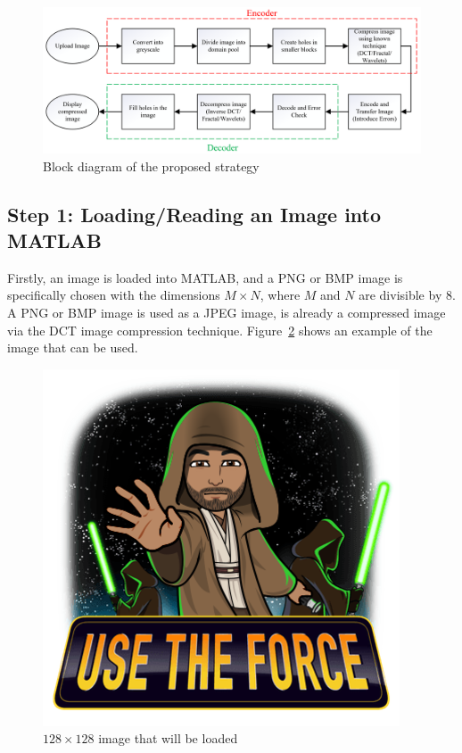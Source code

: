 \documentclass[10pt,twocolumn, a4paper]{witseiepaper}
\begin{document}
\begin{figure}[t!]
\renewcommand{\thefigure}{\arabic{figure}}
\hspace{-0.5cm}
\includegraphics[scale=0.35]{BlockDiagram.png}
\caption{Block diagram of the proposed strategy}
\label{fig: Block Diagram}
\end{figure}

\subsection{Step 1: Loading/Reading an Image into MATLAB}
\label{sec: Step 1}
Firstly, an image is loaded into MATLAB, and a PNG or BMP image is specifically chosen with the dimensions $M\times N$, where $M$ and $N$ are divisible by 8. A PNG or BMP image is used as a JPEG image, is already a compressed image via the DCT image compression technique. Figure~\ref{fig: Step 1} shows an example of the image that can be used. 
\begin{figure}[h!]
\renewcommand{\thefigure}{\arabic{figure}}
\centering
\includegraphics[scale=0.5, frame]{Step1.png}
\caption{$128\times 128$ image that will be loaded}
\label{fig: Step 1}
\end{figure}
\end{document}
